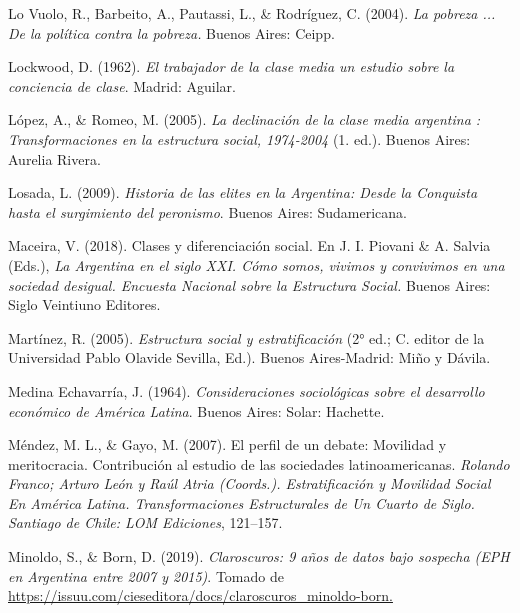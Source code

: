 \documentclass[
]{article}
\newlength{\cslhangindent}
\newlength{\cslentryspacingunit} %
\newenvironment{CSLReferences}[2] %
 {%
  \setlength{\parindent}{0pt}
  \ifodd #1
  \let\oldpar\par
  \def\par{\hangindent=\cslhangindent\oldpar}
  \fi
  \setlength{\parskip}{#2\cslentryspacingunit}
 }%
 {}
\begin{document}
\begin{CSLReferences}{1}{0}
\leavevmode{}%
Lo Vuolo, R., Barbeito, A., Pautassi, L., \& Rodríguez, C. (2004). \emph{La pobreza ... De la política contra la pobreza.} Buenos Aires: Ceipp.

\leavevmode{}%
Lockwood, D. (1962). \emph{El trabajador de la clase media un estudio sobre la conciencia de clase}. Madrid: Aguilar.

\leavevmode{}%
López, A., \& Romeo, M. (2005). \emph{La declinación de la clase media argentina : Transformaciones en la estructura social, 1974-2004} (1. ed.). Buenos Aires: Aurelia Rivera.

\leavevmode{}%
Losada, L. (2009). \emph{Historia de las elites en la {Argentina}: Desde la {Conquista} hasta el surgimiento del peronismo}. Buenos Aires: Sudamericana.

\leavevmode{}%
Maceira, V. (2018). Clases y diferenciación social. En J. I. Piovani \& A. Salvia (Eds.), \emph{La {Argentina} en el siglo {XXI}. {Cómo} somos, vivimos y convivimos en una sociedad desigual. {Encuesta} {Nacional} sobre la {Estructura} {Social}.} Buenos Aires: Siglo Veintiuno Editores.

\leavevmode{}%
Martínez, R. (2005). \emph{Estructura social y estratificación} (2° ed.; C. editor de la Universidad Pablo Olavide Sevilla, Ed.). Buenos Aires-Madrid: Miño y Dávila.

\leavevmode{}%
Medina Echavarría, J. (1964). \emph{Consideraciones sociológicas sobre el desarrollo económico de {América} {Latina}}. Buenos Aires: Solar: Hachette.

\leavevmode{}%
Méndez, M. L., \& Gayo, M. (2007). El perfil de un debate: Movilidad y meritocracia. {Contribución} al estudio de las sociedades latinoamericanas. \emph{Rolando Franco; Arturo León y Raúl Atria (Coords.). Estratificación y Movilidad Social En América Latina. Transformaciones Estructurales de Un Cuarto de Siglo. Santiago de Chile: LOM Ediciones}, 121--157.

\leavevmode{}%
Minoldo, S., \& Born, D. (2019). \emph{Claroscuros: 9 años de datos bajo sospecha ({EPH} en {Argentina} entre 2007 y 2015)}. Tomado de \href{https://issuu.com/cieseditora/docs/claroscuros_minoldo-born}{https://issuu.com/cieseditora/docs/claroscuros\_minoldo-born.}


\end{CSLReferences}
\end{document}
